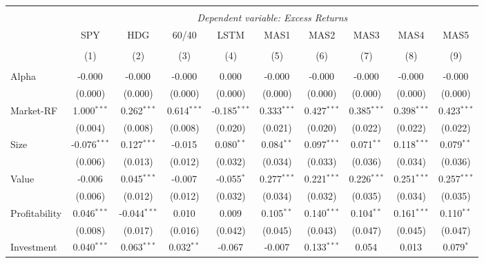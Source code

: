 \begin{table}[!htbp] \centering
\begin{tabular}{@{\extracolsep{5pt}}lccccccccc}
\\[-1.8ex]\hline
\hline \\[-1.8ex]
& \multicolumn{9}{c}{\textit{Dependent variable: Excess Returns}} \
\cr \cline{2-10}
\\[-1.8ex] & \multicolumn{1}{c}{SPY} & \multicolumn{1}{c}{HDG} & \multicolumn{1}{c}{60/40} & \multicolumn{1}{c}{LSTM} & \multicolumn{1}{c}{MAS1} & \multicolumn{1}{c}{MAS2} & \multicolumn{1}{c}{MAS3} & \multicolumn{1}{c}{MAS4} & \multicolumn{1}{c}{MAS5}  \\
\\[-1.8ex] & (1) & (2) & (3) & (4) & (5) & (6) & (7) & (8) & (9) \\
\hline \\[-1.8ex]
 Alpha & -0.000$^{}$ & -0.000$^{}$ & -0.000$^{}$ & 0.000$^{}$ & -0.000$^{}$ & -0.000$^{}$ & -0.000$^{}$ & -0.000$^{}$ & -0.000$^{}$ \\
& (0.000) & (0.000) & (0.000) & (0.000) & (0.000) & (0.000) & (0.000) & (0.000) & (0.000) \\
 Market-RF & 1.000$^{***}$ & 0.262$^{***}$ & 0.614$^{***}$ & -0.185$^{***}$ & 0.333$^{***}$ & 0.427$^{***}$ & 0.385$^{***}$ & 0.398$^{***}$ & 0.423$^{***}$ \\
& (0.004) & (0.008) & (0.008) & (0.020) & (0.021) & (0.020) & (0.022) & (0.022) & (0.022) \\
 Size & -0.076$^{***}$ & 0.127$^{***}$ & -0.015$^{}$ & 0.080$^{**}$ & 0.084$^{**}$ & 0.097$^{***}$ & 0.071$^{**}$ & 0.118$^{***}$ & 0.079$^{**}$ \\
& (0.006) & (0.013) & (0.012) & (0.032) & (0.034) & (0.033) & (0.036) & (0.034) & (0.036) \\
 Value & -0.006$^{}$ & 0.045$^{***}$ & -0.007$^{}$ & -0.055$^{*}$ & 0.277$^{***}$ & 0.221$^{***}$ & 0.226$^{***}$ & 0.251$^{***}$ & 0.257$^{***}$ \\
& (0.006) & (0.012) & (0.012) & (0.032) & (0.034) & (0.032) & (0.035) & (0.034) & (0.035) \\
 Profitability & 0.046$^{***}$ & -0.044$^{***}$ & 0.010$^{}$ & 0.009$^{}$ & 0.105$^{**}$ & 0.140$^{***}$ & 0.104$^{**}$ & 0.161$^{***}$ & 0.110$^{**}$ \\
& (0.008) & (0.017) & (0.016) & (0.042) & (0.045) & (0.043) & (0.047) & (0.045) & (0.047) \\
 Investment & 0.040$^{***}$ & 0.063$^{***}$ & 0.032$^{**}$ & -0.067$^{}$ & -0.007$^{}$ & 0.133$^{***}$ & 0.054$^{}$ & 0.013$^{}$ & 0.079$^{*}$ \\

\end{tabular}
\end{table}

